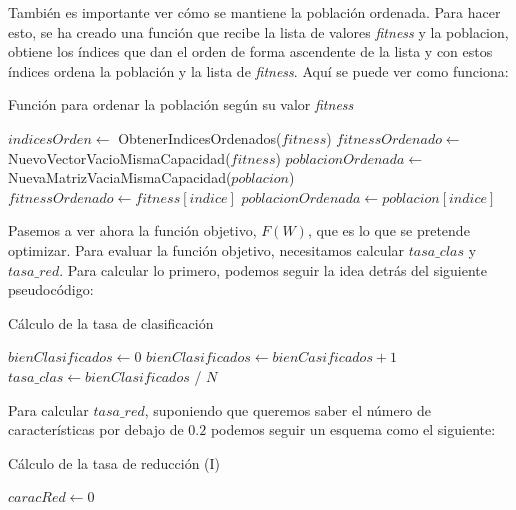 \documentclass[11pt,a4paper]{article}
\begin{document}
También es importante ver cómo se mantiene la población ordenada. Para hacer esto, se ha creado una función que recibe la
lista de valores \textit{fitness} y la poblacion, obtiene los índices que dan el orden de forma ascendente de la lista
y con estos índices ordena la población y la lista de \textit{fitness}. Aquí se puede ver como funciona:

\begin{algorithm}
\caption{Función para ordenar la población según su valor \textit{fitness}}
\begin{algorithmic}[1]
\State $indicesOrden \gets $ ObtenerIndicesOrdenados($fitness$)
\State $fitnessOrdenado \gets$ NuevoVectorVacioMismaCapacidad($fitness$)
\State $poblacionOrdenada \gets$ NuevaMatrizVaciaMismaCapacidad($poblacion$)
	\State $fitnessOrdenado \gets fitness[indice]$
	\State $poblacionOrdenada \gets poblacion[indice]$
\EndFor
\State {}
\EndFunction
\end{algorithmic}
\end{algorithm}

Pasemos a ver ahora la función objetivo, $F(W)$, que es lo que se pretende optimizar. Para evaluar la función objetivo,
necesitamos calcular $tasa\_clas$ y $tasa\_red$. Para calcular lo primero, podemos seguir la idea detrás del siguiente
pseudocódigo:

\begin{algorithm}[H]
\caption{Cálculo de la tasa de clasificación}
\begin{algorithmic}[1]
\State $bienClasificados \gets 0$
		\State $bienClasificados \gets bienCasificados + 1$
	\EndIf
\EndFor
\State $tasa\_clas \gets bienClasificados$ / $N$
\State {}
\EndFunction
\end{algorithmic}
\end{algorithm}

Para calcular $tasa\_red$, suponiendo que queremos saber el número de características por debajo de $0.2$ podemos seguir un
esquema como el siguiente:

\begin{algorithm}[H]
\caption{Cálculo de la tasa de reducción (I)}
\begin{algorithmic}[1]
\State $caracRed \gets 0$
\end{algorithmic}
\end{algorithm}
\end{document}
